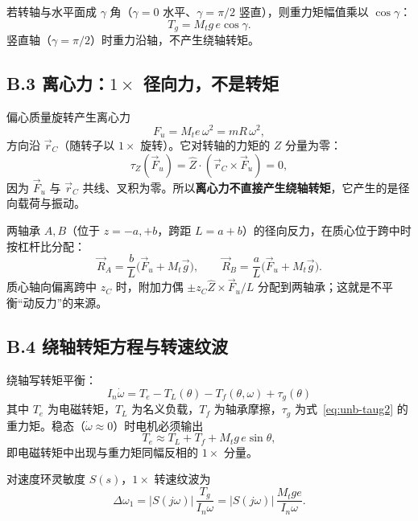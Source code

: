 \documentclass[11pt,a4paper]{article}
\theoremstyle{remark}\newtheorem{remark}{注}
\begin{document}
若转轴与水平面成 $\gamma$ 角（$\gamma=0$ 水平、$\gamma=\pi/2$ 竖直），则重力矩幅值乘以 $\cos\gamma$：
\begin{equation}
T_g=M_t g\,e\cos\gamma .
\label{eq:unb-gamma}
\end{equation}
竖直轴（$\gamma=\pi/2$）时重力沿轴，不产生绕轴转矩。

\subsection*{B.3 离心力：$1\times$ 径向力，不是转矩}

偏心质量旋转产生离心力
\begin{equation}
F_u=M_t e\,\omega^2=m R\,\omega^2,
\label{eq:unb-Fu}
\end{equation}
方向沿 $\vec r_C$（随转子以 $1\times$ 旋转）。它对转轴的力矩的 $Z$ 分量为零：
\begin{equation}
\tau_Z(\vec F_u)=\hat Z\cdot(\vec r_C\times\vec F_u)=0,
\label{eq:unb-tauFu}
\end{equation}
因为 $\vec F_u$ 与 $\vec r_C$ 共线、叉积为零。所以\textbf{离心力不直接产生绕轴转矩}，它产生的是径向载荷与振动。

两轴承 $A,B$（位于 $z=-a,+b$，跨距 $L=a+b$）的径向反力，在质心位于跨中时按杠杆比分配：
\begin{equation}
\vec R_A=\frac{b}{L}\bigl(\vec F_u+M_t\vec g\bigr),\qquad
\vec R_B=\frac{a}{L}\bigl(\vec F_u+M_t\vec g\bigr).
\end{equation}
质心轴向偏离跨中 $z_C$ 时，附加力偶 $\pm z_C\hat Z\times\vec F_u/L$ 分配到两轴承；这就是不平衡“动反力”的来源。

\subsection*{B.4 绕轴转矩方程与转速纹波}

绕轴写转矩平衡：
\begin{equation}
\boxed{\;I_n\dot\omega=T_e-T_L(\theta)-T_f(\theta,\omega)+\tau_g(\theta)\;}
\label{eq:unb-torque}
\end{equation}
其中 $T_e$ 为电磁转矩，$T_L$ 为名义负载，$T_f$ 为轴承摩擦，$\tau_g$ 为式~\eqref{eq:unb-taug2} 的重力矩。稳态（$\dot\omega\approx0$）时电机必须输出
\begin{equation}
T_e\approx T_L+T_f+M_t g\,e\sin\theta,
\end{equation}
即电磁转矩中出现与重力矩同幅反相的 $1\times$ 分量。

对速度环灵敏度 $S(s)$，$1\times$ 转速纹波为
\begin{equation}
\Delta\omega_1=|S(j\omega)|\,\frac{T_g}{I_n\omega}
=|S(j\omega)|\,\frac{M_t g e}{I_n\omega}.
\label{eq:unb-dw}
\end{equation}
\end{document}
